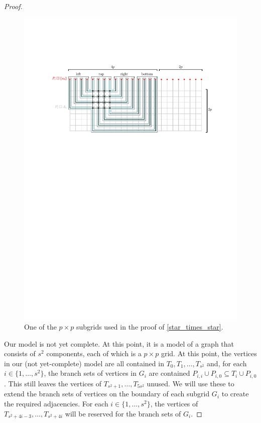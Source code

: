 \documentclass[kpfonts,lotsofwhite]{patmorin}
\theoremstyle{plain}
\theoremstyle{definition}
\begin{document}
\begin{proof}
  \begin{figure}
    \begin{center}
      \includegraphics{subgrid}
    \end{center}
    \caption{One of the $p\times p$ subgrids used in the proof of \cref{star_times_star}.}
    \label{subgrid}
  \end{figure}

  Our model is not yet complete.  At this point, it is a model of a graph that consists of $s^2$ components, each of which is a $p\times p$ grid.  At this point, the vertices in our (not yet-complete) model are all contained in $T_0,T_1,\ldots,T_{s^2}$ and, for each $i\in\{1,\ldots,s^2\}$, the branch sets of vertices in $G_i$ are contained $P_{i,i}\cup P_{i,0}\subseteq T_{i}\cup P_{i,0}$.  This still leaves the vertices of $T_{s^2+1},\ldots,T_{5s^2}$ unused.  We will use these to extend the branch sets of vertices on the boundary of each subgrid $G_i$ to create the required adjacencies.  For each $i\in\{1,\ldots,s^2\}$, the vertices of $T_{s^2+4i-3},\ldots,T_{s^2+4i}$ will be reserved for the branch sets of $G_i$.


\end{proof}
\end{document}
